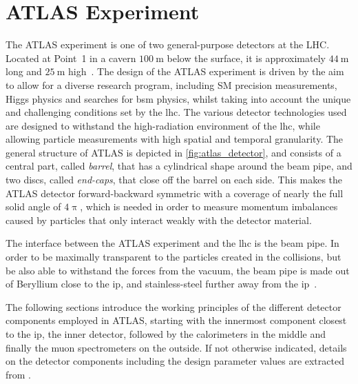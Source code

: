 \section{ATLAS Experiment}\label{sec:atlas_experiment}

The ATLAS experiment is one of two general-purpose detectors at the LHC. Located at Point~1 in a cavern $\SI{100}{\meter}$ below the surface, it is approximately $\SI{44}{\meter}$ long and $\SI{25}{\meter}$ high~\cite{Aad:2008zzm}.
The design of the ATLAS experiment is driven by the aim to allow for a diverse research program, including SM precision measurements, Higgs physics and searches for \gls{bsm} physics, whilst taking into account the unique and challenging conditions set by the \gls{lhc}.
The various detector technologies used are designed to withstand the high-radiation environment of the \gls{lhc}, while allowing particle measurements with high spatial and temporal granularity.
The general structure of ATLAS is depicted in \cref{fig:atlas_detector}, and consists of a central part, called \textit{barrel}, that has a cylindrical shape around the beam pipe, and two discs, called \textit{end-caps}, that close off the barrel on each side.
This makes the ATLAS detector forward-backward symmetric with a coverage of nearly the full solid angle of $4\uppi$, which is needed in order to measure momentum imbalances caused by particles that only interact weakly with the detector material.

The interface between the ATLAS experiment and the \gls{lhc} is the beam pipe.
In order to be maximally transparent to the particles created in the collisions, but be also able to withstand the forces from the vacuum, the beam pipe is made out of Beryllium close to the \gls{ip}, and stainless-steel further away from the \gls{ip}~\cite{Brock:1354959}.

The following sections introduce the working principles of the different detector components employed in ATLAS, starting with the innermost component closest to the \gls{ip}, the inner detector, followed by the calorimeters in the middle and finally the muon spectrometers on the outside. If not otherwise indicated, details on the detector components including the design parameter values are extracted from \cite{Aad:2008zzm}.

